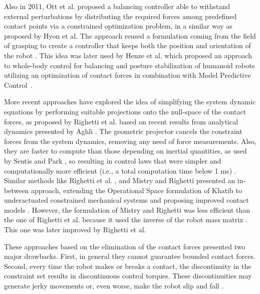 	Also in 2011, Ott et al. \cite{Ott_Humanoids2011} proposed a balancing controller able to withstand
	external perturbations by distributing the required forces among predefined contact points via a
	constrained optimization problem, in a similar way as proposed by Hyon et al. \cite{Hyon_TransRobotics2007}
	The approach reused a formulation coming from the field of grasping to create a controller that
	keeps both the position and orientation of the robot \cite{Ott_Humanoids2011}.
	This idea was later used by Henze et al. \cite{Henze_IROS2014} which proposed an approach to whole-body
	control for balancing and posture	stabilization of humanoid robots utilizing an optimization of contact
	forces in combination with Model Predictive Control~\cite{Henze_IROS2014}.
	
	More recent approaches have explored the idea of simplifying the system dynamic equations by performing
	suitable projections onto the null-space of the contact forces, as proposed by Righetti et al.
	\cite{Righetti_Humanoids2011} based on recent results from analytical dynamics presented by Aghli
	\cite{Aghili_TransRobotics2005}.
	The geometric projector cancels the constraint forces from the system dynamics, removing any need
	of force measurements.
	Also, they are faster to compute than those depending on inertial quantities, as used by Sentis
	\cite{Sentis_PhDThesis2007} and Park \cite{Park_PhDThesis2006}, so resulting in control laws that were
	simpler and computationally more efficient (i.e., a total computation time below 1 ms)
	\cite{DelPrete_IROS2014} \cite{Nori_FrontRobAI2015}.
	Similar methods like Righetti et al. \cite{Righetti_ICRA2011}, and Mistry and Righetti
	\cite{Mistry_RSS2011} presented an in-between approach, extending the	Operational Space formulation
	of Khatib \cite{Khatib_RoboticsAuto1987} to underactuated constrained mechanical systems and proposing
	improved contact models \cite{DelPrete_IROS2014} \cite{Moro_IJHR2016}.
	However, the formulation of Mistry and Righetti	\cite{Mistry_RSS2011} was less efficient than the one
	of Righetti et al. \cite{Righetti_ICRA2011} because it used the inverse of the robot mass matrix
	\cite{DelPrete_IROS2014}.
	This one was later improved by Righetti et al. \cite{Righetti_IJRR2013}
	
	These approaches based on the elimination of the contact forces presented two major drawbacks.
	First, in general they cannot guarantee bounded contact forces.
	Second, every time the robot makes or breaks a contact, the discontinuity in the constraint set
	results in discontinuous control torques.
	These discontinuities may generate jerky movements or, even worse, make the robot slip and fall
	\cite{DelPrete_IROS2014}.
	
